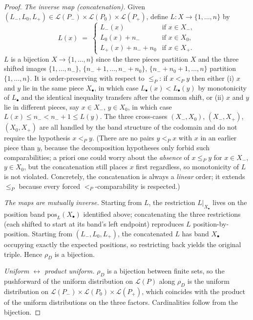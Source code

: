 \begin{proof}
\smallskip\noindent\emph{The inverse map (concatenation).}
Given $(L_-, L_0, L_+) \in \mathcal L(P_-) \times \mathcal L(P_0)
\times \mathcal L(P_+)$, define $L \colon X \to \{1,\ldots,n\}$ by
\[
  L(x) \;=\;
  \begin{cases}
    L_-(x) & \text{if } x \in X_-,\\
    L_0(x) + n_- & \text{if } x \in X_0,\\
    L_+(x) + n_- + n_0 & \text{if } x \in X_+.
  \end{cases}
\]
$L$ is a bijection $X \to \{1,\ldots,n\}$ since the three pieces
partition $X$ and the three shifted images
$\{1,\ldots,n_-\}$, $\{n_-+1,\ldots,n_-+n_0\}$,
$\{n_-+n_0+1,\ldots,n\}$ partition $\{1,\ldots,n\}$. It is
order-preserving with respect to $\le_P$: if $x <_P y$ then either
(i) $x$ and $y$ lie in the same piece $X_\bullet$, in which case
$L_\bullet(x) < L_\bullet(y)$ by monotonicity of $L_\bullet$ and the
identical inequality transfers after the common shift, or (ii) $x$
and $y$ lie in different pieces, say $x \in X_-$, $y \in X_0$, in
which case $L(x) \le n_- < n_- + 1 \le L(y)$. The three cross-cases
$(X_-, X_0)$, $(X_-, X_+)$, $(X_0, X_+)$ are all handled by the
band structure of the codomain and do not require the hypothesis
$x <_P y$. (There are no pairs $y <_P x$ with $x$ in an earlier
piece than $y$, because the decomposition hypotheses only forbid
such comparabilities; a priori one could worry about the
\emph{absence} of $x \le_P y$ for $x \in X_-$, $y \in X_0$, but the
concatenation still places $x$ first regardless, so monotonicity of
$L$ is not violated. Concretely, the concatenation is always a
\emph{linear} order; it extends $\le_P$ because every forced
$<_P$-comparability is respected.)

\smallskip\noindent\emph{The maps are mutually inverse.}
Starting from $L$, the restriction $L|_{X_\bullet}$ lives on the
position band $\mathrm{pos}_L(X_\bullet)$ identified above;
concatenating the three restrictions (each shifted to start at its
band's left endpoint) reproduces $L$ position-by-position. Starting
from $(L_-, L_0, L_+)$, the concatenated $L$ has band $X_\bullet$
occupying exactly the expected positions, so restricting back yields
the original triple. Hence $\rho_D$ is a bijection.

\smallskip\noindent\emph{Uniform $\leftrightarrow$ product uniform.}
$\rho_D$ is a bijection between finite sets, so the pushforward of
the uniform distribution on $\mathcal L(P)$ along $\rho_D$ is the
uniform distribution on $\mathcal L(P_-) \times \mathcal L(P_0)
\times \mathcal L(P_+)$, which coincides with the product of the
uniform distributions on the three factors. Cardinalities follow
from the bijection.
\end{proof}

